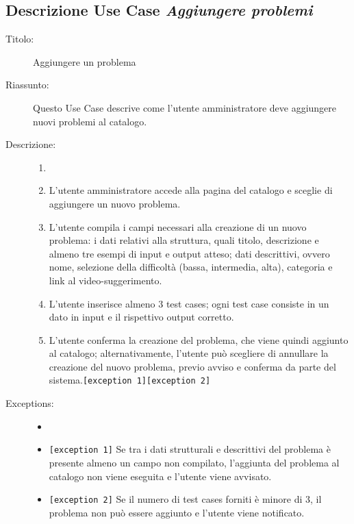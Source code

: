 \documentclass[11pt, a4paper]{article}
\theoremstyle{definition} %
\begin{document}
\subsection*{Descrizione Use Case \textit{Aggiungere problemi}}
\begin{description}
    \item[Titolo:] Aggiungere un problema
    
    \item[Riassunto:] Questo Use Case descrive come l'utente amministratore
    deve aggiungere nuovi problemi al catalogo.

    \item[Descrizione:]
    \begin{enumerate}
        \item[]
        \item L'utente amministratore accede alla pagina del catalogo e sceglie di aggiungere un nuovo problema.
        \item L'utente compila i campi necessari alla creazione di un nuovo problema: i dati relativi alla struttura, quali titolo, descrizione e almeno tre esempi di input e output atteso; dati descrittivi, ovvero nome, selezione della difficoltà (bassa, intermedia, alta), categoria e link al video-suggerimento.
        \item L'utente inserisce almeno 3 test cases; ogni test case consiste in un dato in input e il rispettivo output corretto.
        \item L'utente conferma la creazione del problema, che viene quindi aggiunto al catalogo; alternativamente, l'utente può scegliere di annullare la creazione del nuovo problema, previo avviso e conferma da parte del sistema.\texttt{[exception 1]}\texttt{[exception 2]}
    \end{enumerate}
    
    \item[Exceptions:]
    \begin{itemize}
        \item[]
        \item \texttt{[exception 1]} Se tra i dati strutturali e descrittivi del problema è presente almeno un campo non compilato, l'aggiunta del problema al catalogo non viene eseguita e l'utente viene avvisato.
        \item \texttt{[exception 2]} Se il numero di test cases forniti è minore di 3, il problema non può essere aggiunto e l'utente viene notificato.
    \end{itemize}
\end{description}
\end{document}
